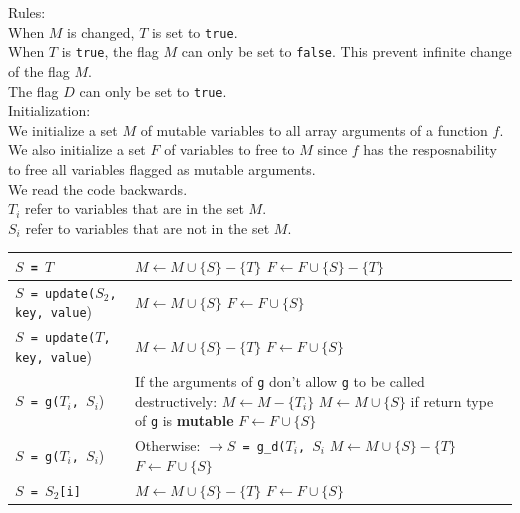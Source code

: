 \documentclass[12pt,a4paper,titlepage]{article}
\newcommand{\cl}[1]{\texttt{#1}}
\newcommand{\mut}{  \textbf{ mutable } }
\begin{document}
Rules:\\
When $M$ is changed, $T$ is set to \cl{true}.\\
When $T$ is \cl{true}, the flag $M$ can only be set to \cl{false}.
This prevent infinite change of the flag $M$.\\
The flag $D$ can only be set to \cl{true}.\\



Initialization:\\


We initialize a set $M$ of mutable variables to all array arguments of a function $f$.
We also initialize a set $F$ of variables to free to $M$ since $f$ has the resposnability to free all variables flagged as mutable arguments.\\

We read the code backwards.\\
$T_i$ refer to variables that are in the set $M$.\\
$S_i$ refer to variables that are not in the set $M$.

\begin{tabular}{|p{60mm}|p{90mm}|}
\hline
\cl{$S$ = $T$} & $M \leftarrow M \cup \{ S \} - \{T\}$ \newline $F \leftarrow F \cup \{ S \} - \{T\}$  \\ \hline
\cl{$S$ = update($S_2$, key, value}) & $M \leftarrow M \cup \{ S \}$ \newline $F \leftarrow F \cup \{ S \}$ \\ \hline
\cl{$S$ = update($T$, key, value}) & $M \leftarrow M \cup \{ S \}  - \{T\}$ \newline $F \leftarrow F \cup \{ S \}$ \\ \hline

\cl{$S$ = g($T_i$, $S_i$}) & If the arguments of \cl{g} don't allow \cl{g} to be called destructively: \newline $M \leftarrow M - \{T_i \}$ \newline $M \leftarrow M \cup \{ S \}$ if return type of \cl{g} is \mut \newline $F \leftarrow F \cup \{ S\}$ \\ \hline

\cl{$S$ = g($T_i$, $S_i$}) & Otherwise: \newline \cl{$\rightarrow S$ = g\_d($T_i$, $S_i$} \newline $M \leftarrow M \cup \{ S \}  - \{T\}$ \newline $F \leftarrow F \cup \{ S \}$ \\ \hline

\cl{$S$ = $S_2$[i]} & $M \leftarrow M \cup \{ S \}  - \{T\}$ \newline $F \leftarrow F \cup \{ S \}$ \\ \hline


\end{tabular}
\end{document}
